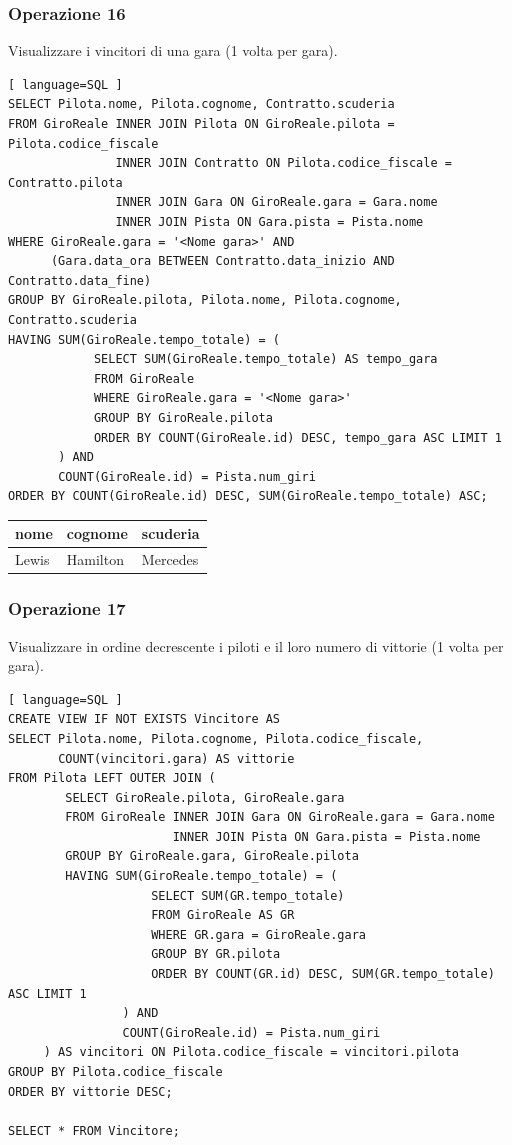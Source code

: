 \documentclass[11pt]{article}
\begin{document}
\subsubsection{Operazione 16}
Visualizzare i vincitori di una gara (1 volta per gara).
\begin{lstlisting}[ language=SQL ]
SELECT Pilota.nome, Pilota.cognome, Contratto.scuderia
FROM GiroReale INNER JOIN Pilota ON GiroReale.pilota = Pilota.codice_fiscale
               INNER JOIN Contratto ON Pilota.codice_fiscale = Contratto.pilota
               INNER JOIN Gara ON GiroReale.gara = Gara.nome
               INNER JOIN Pista ON Gara.pista = Pista.nome
WHERE GiroReale.gara = '<Nome gara>' AND
      (Gara.data_ora BETWEEN Contratto.data_inizio AND Contratto.data_fine)
GROUP BY GiroReale.pilota, Pilota.nome, Pilota.cognome, Contratto.scuderia
HAVING SUM(GiroReale.tempo_totale) = (
            SELECT SUM(GiroReale.tempo_totale) AS tempo_gara
            FROM GiroReale
            WHERE GiroReale.gara = '<Nome gara>'
            GROUP BY GiroReale.pilota
            ORDER BY COUNT(GiroReale.id) DESC, tempo_gara ASC LIMIT 1
       ) AND
       COUNT(GiroReale.id) = Pista.num_giri
ORDER BY COUNT(GiroReale.id) DESC, SUM(GiroReale.tempo_totale) ASC;
\end{lstlisting}

\begin{table}[!ht]
    \centering
    \begin{tabular}{|l|l|l|}
    \hline
        nome & cognome & scuderia \\ \hline
        Lewis & Hamilton & Mercedes \\ \hline
    \end{tabular}
\end{table}


\subsubsection{Operazione 17}
Visualizzare in ordine decrescente i piloti e il loro numero di vittorie (1 volta per gara).
\begin{lstlisting}[ language=SQL ]
CREATE VIEW IF NOT EXISTS Vincitore AS
SELECT Pilota.nome, Pilota.cognome, Pilota.codice_fiscale, 
       COUNT(vincitori.gara) AS vittorie
FROM Pilota LEFT OUTER JOIN (
        SELECT GiroReale.pilota, GiroReale.gara
        FROM GiroReale INNER JOIN Gara ON GiroReale.gara = Gara.nome
                       INNER JOIN Pista ON Gara.pista = Pista.nome
        GROUP BY GiroReale.gara, GiroReale.pilota
        HAVING SUM(GiroReale.tempo_totale) = (
                    SELECT SUM(GR.tempo_totale)
                    FROM GiroReale AS GR
                    WHERE GR.gara = GiroReale.gara
                    GROUP BY GR.pilota
                    ORDER BY COUNT(GR.id) DESC, SUM(GR.tempo_totale) ASC LIMIT 1
                ) AND
                COUNT(GiroReale.id) = Pista.num_giri
     ) AS vincitori ON Pilota.codice_fiscale = vincitori.pilota
GROUP BY Pilota.codice_fiscale
ORDER BY vittorie DESC;

SELECT * FROM Vincitore;
\end{lstlisting}
\end{document}
